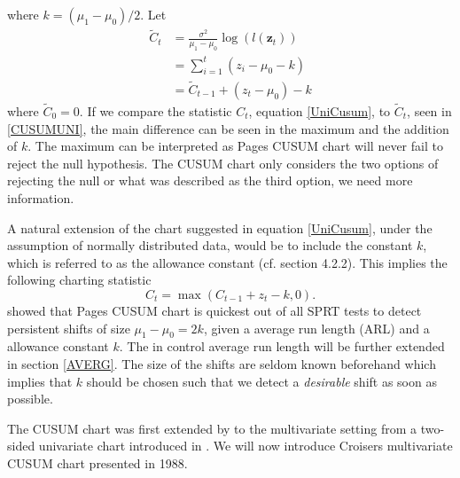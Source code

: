 where $k=(\mu_1-\mu_0)/2$. Let 
\begin{align}
\tilde{C}_t	&=\frac{\sigma^2}{\mu_1-\mu_0}\log(l(\mathbf{z}_t))\\ 
			&= \sum_{i=1}^t \left(z_i-\mu_0 -k\right)\\ 
			&= \tilde{C}_{t-1} + (z_t-\mu_0)-k \label{CUSUMUNI}
\end{align}
where $\tilde{C}_0=0$. If we compare the statistic $C_t$, equation \eqref{UniCusum}, to $\tilde{C}_t$, seen in \eqref{CUSUMUNI}, the main difference can be seen in the maximum and the addition of $k$. The maximum can be interpreted as Pages CUSUM chart will never fail to reject the null hypothesis. The CUSUM chart only considers the two options of rejecting the null or what was described as the third option, we need more information. 

A natural extension of the chart suggested in equation \eqref{UniCusum}, under the assumption of normally distributed data, would be to include the constant $k$, which is referred to as the allowance constant (cf. \citet{SPCIntro} section 4.2.2). This implies the following charting statistic
\begin{equation}\label{UniCusum2}
C_{t}=\max(C_{t-1}+z_t-k,0).
\end{equation}
\citet{Moustakides} showed that Pages CUSUM chart is quickest out of all SPRT tests to detect persistent shifts of size $\mu_1-\mu_0=2k$, given a average run length (ARL) and a allowance constant $k$. The in control average run length will be further extended in section \ref{AVERG}. The size of the shifts are seldom known beforehand which implies that $k$ should be chosen such that we detect a \textit{desirable} shift as soon as possible. 

The CUSUM chart was first extended by \citet{Croiser1988} to the multivariate setting from a two-sided univariate chart introduced in \citet{Croiser1986}. We will now introduce Croisers multivariate CUSUM chart presented in 1988. 
